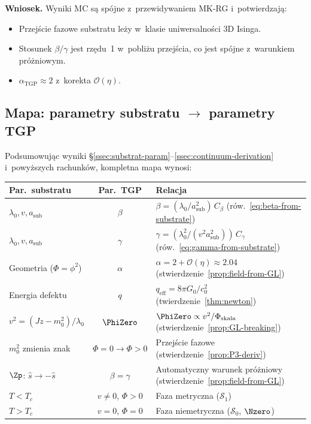 \noindent\textbf{Wniosek.}
Wyniki MC s\k{a} sp\'ojne z~przewidywaniem MK-RG
i~potwierdzaj\k{a}:
\begin{itemize}[nosep]
  \item Przej\'scie fazowe substratu le\.zy w~klasie
    uniwersalno\'sci 3D Isinga.
  \item Stosunek $\beta/\gamma$ jest rz\k{e}du~1 w~pobli\.zu
    przej\'scia, co jest sp\'ojne z~warunkiem pr\'o\.zniowym.
  \item $\alpha_{\mathrm{TGP}} \approx 2$ z~korekta
    $\mathcal{O}(\eta)$.
\end{itemize}

\subsection{Mapa: parametry substratu $\to$ parametry TGP}%
\label{app:B-mapa}

Podsumowuj\k{a}c wyniki
\S\ref{ssec:substrat-param}--\ref{ssec:continuum-derivation}
i~powy\.zszych rachunk\'ow, kompletna mapa wynosi:

\begin{center}
\small
\begin{tabular}{@{}>{\raggedright}p{3.2cm}cp{7cm}@{}}
\toprule
\textbf{Par.\ substratu} & \textbf{Par.\ TGP} & \textbf{Relacja} \\
\midrule
$\lambda_0, v, a_{\mathrm{sub}}$
  & $\beta$ & $\beta = (\lambda_0/a_{\mathrm{sub}}^2)\,C_\beta$
    (r\'ow.~\ref{eq:beta-from-substrate}) \\
$\lambda_0, v, a_{\mathrm{sub}}$
  & $\gamma$ & $\gamma = (\lambda_0^2/(v^2 a_{\mathrm{sub}}^2))\,C_\gamma$
    (r\'ow.~\ref{eq:gamma-from-substrate}) \\
Geometria ($\Phi = \phi^2$)
  & $\alpha$ & $\alpha = 2 + \mathcal{O}(\eta) \approx 2.04$
    (stwierdzenie~\ref{prop:field-from-GL}) \\
Energia defektu
  & $q$ & $q_{\mathrm{eff}} = 8\pi G_0/c_0^2$
    (twierdzenie~\ref{thm:newton}) \\
$v^2 = (Jz - m_0^2)/\lambda_0$
  & $\PhiZero$ & $\PhiZero \propto v^2 / \Phi_{\mathrm{skala}}$
    (stwierdzenie~\ref{prop:GL-breaking}) \\
$m_0^2$ zmienia znak
  & $\Phi = 0 \to \Phi > 0$ & Przej\'scie fazowe
    (stwierdzenie~\ref{prop:P3-deriv}) \\
$\Zp$: $\hat{s} \to -\hat{s}$
  & $\beta = \gamma$ & Automatyczny warunek pr\'o\.zniowy
    (stwierdzenie~\ref{prop:field-from-GL}) \\
$T < T_c$
  & $v \neq 0$, $\Phi > 0$ & Faza metryczna ($\mathcal{S}_1$) \\
$T > T_c$
  & $v = 0$, $\Phi = 0$ & Faza niemetryczna ($\mathcal{S}_0$, $\Nzero$) \\
\bottomrule
\end{tabular}
\end{center}

